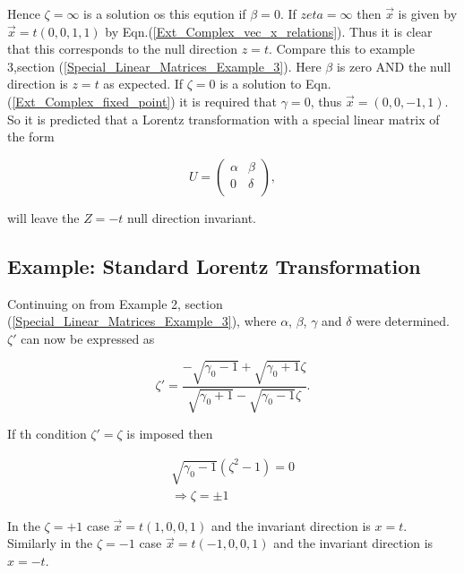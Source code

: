\noindent Hence $\zeta = \infty$ is a solution os this eqution if $\beta = 0$. If $zeta = \infty$ then $\vec{x}$ is given by $\vec{x} = t(0,0,1,1)$ by Eqn.(\ref{Ext_Complex_vec_x_relations}). Thus it is clear that this corresponds to the null direction $z=t$. Compare this to example 3,section (\ref{Special_Linear_Matrices_Example_3}). Here $\beta$ is zero AND the null direction is $z=t$ as expected. If $\zeta = 0$ is a solution to Eqn.(\ref{Ext_Complex_fixed_point}) it is required that $\gamma = 0$, thus $\vec{x} = (0,0,-1,1)$. So it is predicted that a Lorentz transformation with a special linear matrix of the form

\begin{equation*}   
U = 
\left(
\begin{array}{cc}
\alpha & \beta \\
0 & \delta \\
\end{array}
\right),
\end{equation*}   

\noindent will leave the $Z=-t$ null direction invariant.

\subsection{Example: Standard Lorentz Transformation}

Continuing on from Example 2, section (\ref{Special_Linear_Matrices_Example_3}), where $\alpha$, $\beta$, $\gamma$ and $\delta$ were determined. $\zeta'$ can now be expressed as

\begin{equation*} 
\zeta' = \frac{-\sqrt{\gamma_0 - 1} + \sqrt{\gamma_0 + 1}\zeta}{\sqrt{\gamma_0 + 1} - \sqrt{\gamma_0 - 1}\zeta}.
\end{equation*}

If th condition $\zeta' = \zeta$ is imposed then

\begin{eqnarray*}
\sqrt{\gamma_0 - 1}(\zeta^2 - 1) = 0 \\
\Rightarrow \zeta = \pm 1
\end{eqnarray*}

In the $\zeta = +1$ case $\vec{x} = t(1,0,0,1)$ and the invariant direction is $x=t$. Similarly in the $\zeta = -1$ case $\vec{x} = t(-1,0,0,1)$ and the invariant direction is $x = - t$. 






   












